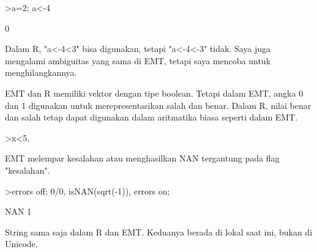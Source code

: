 \documentclass[12pt,Times new roman,letterpaper]{book}
\begin{document}
\begin{eulernootebook}
\begin{eulercomment}
\begin{eulercomment}
\begin{eulernootebook}
\begin{eulercomment}
\begin{eulercomment}
\begin{eulercomment}
\begin{eulercomment}
\begin{eulercomment}
\begin{eulercomment}
\begin{eulercomment}
\begin{eulercomment}
\begin{eulercomment}
\begin{eulercomment}
\begin{eulercomment}
\begin{eulerprompt}
>a=2; a<-4
\end{eulerprompt}
\begin{euleroutput}
  0
\end{euleroutput}
\begin{eulercomment}
Dalam R, "a\textless{}-4\textless{}3" bisa digunakan, tetapi "a\textless{}-4\textless{}-3" tidak. Saya juga
mengalami ambiguitas yang sama di EMT, tetapi saya mencoba untuk
menghilangkannya.

EMT dan R memiliki vektor dengan tipe boolean. Tetapi dalam EMT, angka
0 dan 1 digunakan untuk merepresentasikan salah dan benar. Dalam R,
nilai benar dan salah tetap dapat digunakan dalam aritmatika biasa
seperti dalam EMT.
\end{eulercomment}
\begin{eulerprompt}
>x<5, %
\end{eulerprompt}
\begin{euleroutput}
  [0,  0,  1,  0,  0]
  [0,  0,  3.1,  0,  0]
\end{euleroutput}
\begin{eulercomment}
EMT melempar kesalahan atau menghasilkan NAN tergantung pada flag
"kesalahan".
\end{eulercomment}
\begin{eulerprompt}
>errors off; 0/0, isNAN(sqrt(-1)), errors on;
\end{eulerprompt}
\begin{euleroutput}
  NAN
  1
\end{euleroutput}
\begin{eulercomment}
String sama saja dalam R dan EMT. Keduanya berada di lokal saat ini,
bukan di Unicode.


\end{eulercomment}
\end{eulercomment}
\end{eulercomment}
\end{eulercomment}
\end{eulercomment}
\end{eulercomment}
\end{eulercomment}
\end{eulercomment}
\end{eulercomment}
\end{eulercomment}
\end{eulercomment}
\end{eulercomment}
\end{eulernootebook}
\end{eulercomment}
\end{eulercomment}
\end{eulernootebook}
\end{document}
